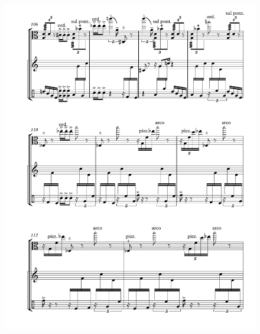 \begin{figure}[htbp]
    \centering
	\includegraphics[width=6.5in]{figures/Viola_Percussion_15.pdf}
\end{figure}

